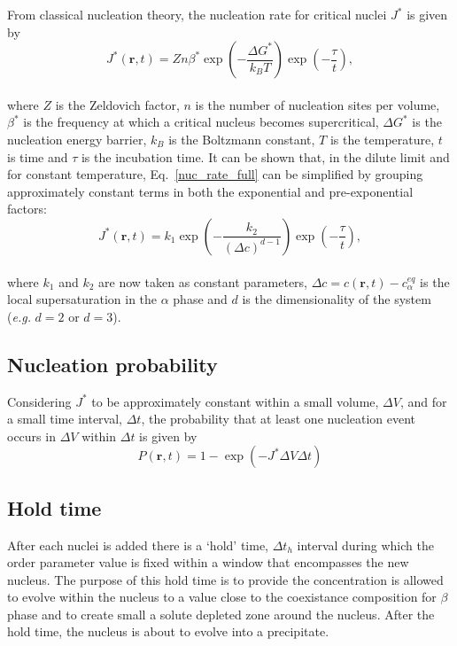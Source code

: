 \documentclass[11pt]{article}
\renewcommand{\=}[1]{\stackrel{#1}{=}} %
\theoremstyle{definition}
\theoremstyle{remark}
\begin{document}
From classical nucleation theory, the nucleation rate for critical nuclei $J^*$ is given by
\\
\begin{equation}
\label{nuc_rate_full}
J^*(\mathbf{r},t)=Zn\beta^*\exp \left( -\frac{\Delta G^*}{k_B T} \right) \exp \left( -\frac{\tau}{t} \right),
\end{equation}
\\
where $Z$ is the Zeldovich factor, $n$ is the number of nucleation sites per volume, $\beta^*$ is the frequency at which a critical nucleus becomes supercritical, $\Delta G^*$ is the nucleation energy barrier, $k_B$ is the Boltzmann constant, $T$ is the temperature, $t$ is time and $\tau$ is the incubation time. It can be shown that, in the dilute limit and for constant temperature, Eq.~\eqref{nuc_rate_full} can be simplified by grouping approximately constant terms in both the exponential and pre-exponential factors:
\\
\begin{equation}
\label{nuc_rate_simp}
J^*(\mathbf{r},t)=k_1\exp \left( -\frac{k_2}{(\Delta c)^{d-1}} \right) \exp \left(-\frac{\tau}{t} \right),
\end{equation}
\\
where  $k_1$ and $k_2$ are now taken as constant parameters, $\Delta c=c(\mathbf{r},t)-c_\alpha^{eq}$ is the local supersaturation in the $\alpha$ phase and $d$ is the dimensionality of the system ({\it e.g.} $d=2$ or $d=3$).\\

\subsection{Nucleation probability}

Considering  $J^*$ to be approximately constant within a small volume, $\Delta V$, and for a small time interval, $\Delta t$, the probability that at least one nucleation event occurs in $\Delta V$ within $\Delta t$ is given by
\\
\begin{equation}
\label{nuc_prob}
P(\mathbf{r},t) = 1 - \exp \left( -J^* \Delta V \Delta t \right)
\end{equation}
\subsection{Hold time}

After each nuclei is added there is a `hold' time, $\Delta t_h$ interval during which the order parameter value is fixed within a window that encompasses the new nucleus. The purpose of this hold time is to provide the concentration is allowed to evolve within the nucleus to a value close to the coexistance composition for $\beta$ phase and to create small a solute depleted zone around the nucleus. After the hold time, the nucleus is about to evolve into a precipitate.
\end{document}
